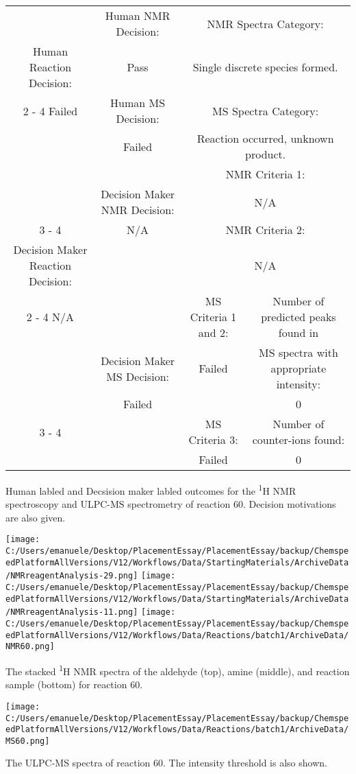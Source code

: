 \documentclass{article}%
\begin{document}
\begin{Decision Table}[H]%
\begin{tabular}{|c|c|c|c|}%
\hline%
&Human NMR Decision:&\multicolumn{2}{|c|}{NMR Spectra Category:}\\%
Human Reaction Decision:&Pass&\multicolumn{2}{|c|}{Single discrete species formed.}\\%
\cline{2%
-%
4}%
Failed&Human MS Decision:&\multicolumn{2}{|c|}{MS Spectra Category:}\\%
&Failed&\multicolumn{2}{|c|}{Reaction occurred, unknown product.}\\%
\hline%
&&\multicolumn{2}{|c|}{NMR Criteria 1:}\\%
&Decision Maker NMR Decision:&\multicolumn{2}{|c|}{N/A}\\%
\cline{3%
-%
4}%
&N/A&\multicolumn{2}{|c|}{NMR Criteria 2:}\\%
Decision Maker Reaction Decision:&&\multicolumn{2}{|c|}{N/A}\\%
\cline{2%
-%
4}%
N/A&&MS Criteria 1 and 2:&Number of predicted peaks found in\\%
&Decision Maker MS Decision:&Failed&MS spectra with appropriate intensity:\\%
&Failed&&0\\%
\cline{3%
-%
4}%
&&MS Criteria 3:&Number of counter{-}ions found:\\%
&&Failed&0\\%
\hline%
\end{tabular}%
\caption{Human labled and Decsision maker labled outcomes for the \textsuperscript{1}H NMR spectroscopy and ULPC-MS spectrometry of reaction 60. Decision motivations are also given.}%
\end{Decision Table}%
\begin{NMR Spectra}[H]%
\begin{center}%
\texttt{[image: C:/Users/emanuele/Desktop/PlacementEssay/PlacementEssay/backup/ChemspeedPlatformAllVersions/V12/Workflows/Data/StartingMaterials/ArchiveData/NMRreagentAnalysis-29.png]}\hfill%
\texttt{[image: C:/Users/emanuele/Desktop/PlacementEssay/PlacementEssay/backup/ChemspeedPlatformAllVersions/V12/Workflows/Data/StartingMaterials/ArchiveData/NMRreagentAnalysis-11.png]}\hfill%
\texttt{[image: C:/Users/emanuele/Desktop/PlacementEssay/PlacementEssay/backup/ChemspeedPlatformAllVersions/V12/Workflows/Data/Reactions/batch1/ArchiveData/NMR60.png]}\hfill%
\end{center}%
\caption{The stacked \textsuperscript{1}H NMR spectra of the aldehyde (top), amine (middle), and reaction sample (bottom) for reaction 60.}%
\end{NMR Spectra}%
\begin{MS Spectra}[H]%
\begin{center}%
\texttt{[image: C:/Users/emanuele/Desktop/PlacementEssay/PlacementEssay/backup/ChemspeedPlatformAllVersions/V12/Workflows/Data/Reactions/batch1/ArchiveData/MS60.png]}\hfill%
\end{center}%
\caption{The ULPC-MS spectra of reaction 60. The intensity threshold is also shown.}%
\end{MS Spectra}%
\end{document}
